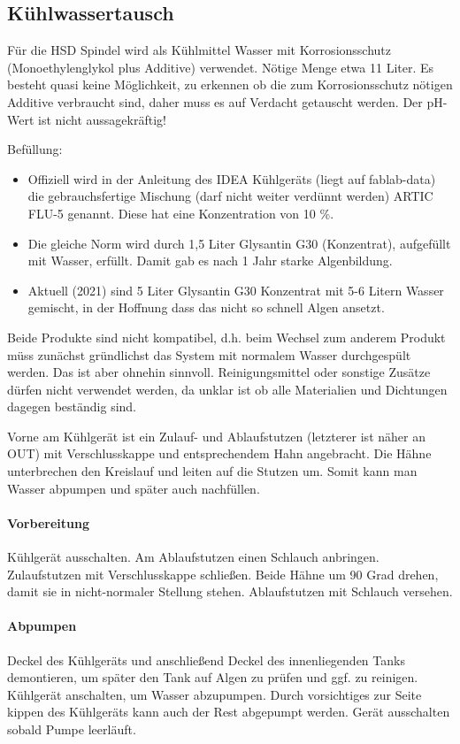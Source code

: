 \documentclass{\basedir/fablab-document}
\begin{document}
\subsection{Kühlwassertausch}
Für die HSD Spindel wird als Kühlmittel Wasser mit Korrosionsschutz (Monoethylenglykol plus Additive) verwendet. Nötige Menge etwa 11 Liter. Es besteht quasi keine Möglichkeit, zu erkennen ob die zum Korrosionsschutz nötigen Additive verbraucht sind, daher muss es auf Verdacht getauscht werden. Der pH-Wert ist nicht aussagekräftig!

Befüllung:
\begin{itemize}
	\item Offiziell wird in der Anleitung des IDEA Kühlgeräts (liegt auf fablab-data) die gebrauchsfertige Mischung (darf nicht weiter verdünnt werden) ARTIC FLU-5 genannt. Diese hat eine Konzentration von 10 \%.
	\item Die gleiche Norm wird durch 1,5 Liter Glysantin G30 (Konzentrat), aufgefüllt mit Wasser, erfüllt. Damit gab es nach 1 Jahr starke Algenbildung.
	\item Aktuell (2021) sind 5 Liter Glysantin G30 Konzentrat mit 5-6 Litern Wasser gemischt, in der Hoffnung dass das nicht so schnell Algen ansetzt.
\end{itemize}
Beide Produkte sind nicht kompatibel, d.h. beim Wechsel zum anderem Produkt müss zunächst gründlichst das System mit normalem Wasser durchgespült werden. Das ist aber ohnehin sinnvoll. Reinigungsmittel oder sonstige Zusätze dürfen nicht verwendet werden, da unklar ist ob alle Materialien und Dichtungen dagegen beständig sind.

Vorne am Kühlgerät ist ein Zulauf- und Ablaufstutzen (letzterer ist näher an OUT) mit Verschlusskappe und entsprechendem Hahn angebracht. Die Hähne unterbrechen den Kreislauf und leiten auf die Stutzen um. Somit kann man Wasser abpumpen und später auch nachfüllen.

\paragraph{Vorbereitung} Kühlgerät ausschalten. Am Ablaufstutzen einen Schlauch anbringen. Zulaufstutzen mit Verschlusskappe schließen. Beide Hähne um 90 Grad drehen, damit sie in nicht-normaler Stellung stehen. Ablaufstutzen mit Schlauch versehen.

\paragraph{Abpumpen} Deckel des Kühlgeräts und anschließend Deckel des innenliegenden Tanks demontieren, um später den Tank auf Algen zu prüfen und ggf. zu reinigen. Kühlgerät anschalten, um Wasser abzupumpen. Durch vorsichtiges zur Seite kippen des Kühlgeräts kann auch der Rest abgepumpt werden. Gerät ausschalten sobald Pumpe leerläuft.
\end{document}
